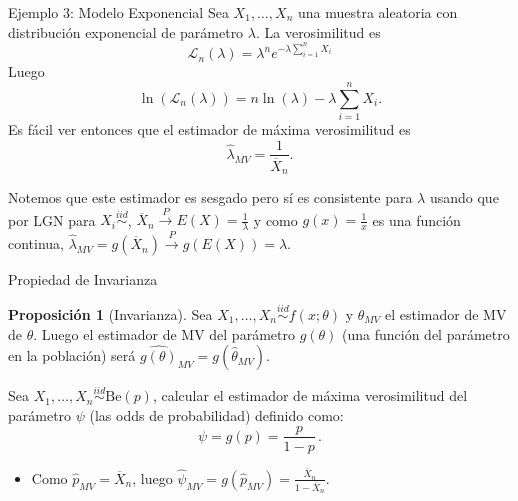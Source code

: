 \documentclass{beamer}
\theoremstyle{definition}
\newtheorem{proposition}{Proposici\'on}
\newcommand{\cp}{\overset{P}{\rightarrow}}
\begin{document}
%     

\begin{frame}{\color{rosee}Ejemplo 3: Modelo Exponencial}
  \small
    Sea $X_{1},\dots,X_{n}$ una muestra aleatoria con distribuci\'on
    exponencial de par\'ametro $\lambda$. La verosimilitud es
    $$
    \mathcal{L}_{n}(\lambda)= \lambda^{n}
    e^{-\lambda{\sum_{i=1}^{n} X_{i}}}
    $$
    Luego
    $$
    \ln\left(\mathcal{L}_{n}(\lambda)\right)=n\ln(\lambda) -\lambda
    \sum_{i=1}^{n}
    X_{i}.
    $$
    Es f\'acil ver entonces que el estimador de m\'axima verosimilitud es
    $$
    \widehat{\lambda}_{MV}=\frac{1}{\overline{X}_{n}}.
    $$
  
  Notemos que este estimador es sesgado pero s\'i es consistente para $\lambda$ usando que por LGN para $X_i\stackrel{iid}{\sim}$, $\overline{X}_{n}\cp E(X)=\frac{1}{\lambda}$ y como $g(x)=\frac{1}{x}$ es una función continua, $\widehat{\lambda}_{MV}=g\left(\overline{X}_{n}\right) \cp g\left(E(X)\right)=\lambda$.
\end{frame}



\begin{frame}{\color{rosee}Propiedad de Invarianza}
  \begin{proposition}[Invarianza]
    Sea $X_{1},\dots,X_{n}\stackrel{iid}{\sim} f(x;\theta)$ y $\widehat{\theta}_{MV}$ el estimador de MV de $\theta$. Luego el estimador de MV del parámetro $g(\theta)$ (una función del parámetro en la población) será $\widehat{g(\theta)}_{MV}=g(\widehat{\theta}_{MV})$.
  \end{proposition}
\medskip
  \begin{example}
    Sea $X_{1},\dots, X_{n}\stackrel{iid}{\sim}\text{Be}(p)$, calcular el estimador de m\'axima verosimilitud del parámetro $\psi$ (las odds de probabilidad) definido como:
    \[\psi = g(p) = \frac{p}{1-p}\,.\]
  \end{example}
  \medskip
  \begin{itemize}
      \item Como $\widehat{p}_{MV} = \overline{X}_n$, luego $\widehat{\psi}_{MV}=g( \widehat{p}_{MV}) = \frac{\overline{X}_n}{1-\overline{X}_n}$.
  \end{itemize}
\end{frame}
\end{document}
